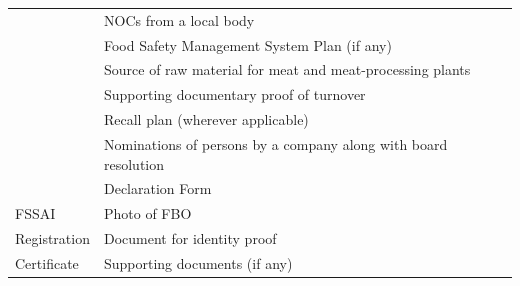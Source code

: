 \documentclass[a4paper, 12pt]{article}
\newcommand\tabitem{\makebox[1em][r]{\textbullet~}}
\begin{document}
\begin{longtable}{>{\raggedright}p{2.5cm}>{\raggedright\arraybackslash}p{13cm}}
          & \tabitem NOCs from a local body \\
          & \tabitem Food Safety Management System Plan (if any) \\
          & \tabitem Source of raw material for meat and meat-processing plants \\
          & \tabitem Supporting documentary proof of turnover \\
          & \tabitem Recall plan (wherever applicable) \\
          & \tabitem Nominations of persons by a company along with board resolution \\
          & \tabitem Declaration Form \\
    \midrule
    FSSAI & \tabitem Photo of FBO \\
    Registration & \tabitem  Document for identity proof \\
    Certificate & \tabitem Supporting documents (if any) \\
    \end{longtable}%
  \label{tab:addlabel}%
\normalsize
\newpage

\end{document}
